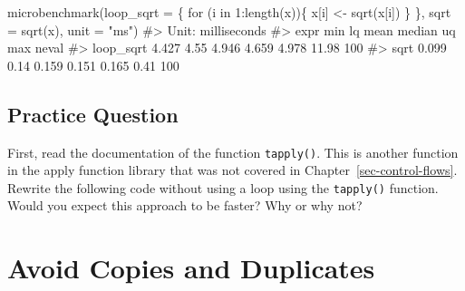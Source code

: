 \documentclass[
  letterpaper,
]{latex/krantz}
\makeatletter
\newenvironment{Shaded}{\begin{snugshade}}{\end{snugshade}}
\newcommand{\AttributeTok}[1]{\textcolor[rgb]{0.40,0.45,0.13}{#1}}
\newcommand{\CommentTok}[1]{\textcolor[rgb]{0.37,0.37,0.37}{#1}}
\newcommand{\ControlFlowTok}[1]{\textcolor[rgb]{0.00,0.23,0.31}{#1}}
\newcommand{\DecValTok}[1]{\textcolor[rgb]{0.68,0.00,0.00}{#1}}
\newcommand{\FunctionTok}[1]{\textcolor[rgb]{0.28,0.35,0.67}{#1}}
\newcommand{\NormalTok}[1]{\textcolor[rgb]{0.00,0.23,0.31}{#1}}
\newcommand{\OtherTok}[1]{\textcolor[rgb]{0.00,0.23,0.31}{#1}}
\newcommand{\SpecialCharTok}[1]{\textcolor[rgb]{0.37,0.37,0.37}{#1}}
\newcommand{\StringTok}[1]{\textcolor[rgb]{0.13,0.47,0.30}{#1}}
\newenvironment{kframe}{%
\medskip{}
\setlength{\fboxsep}{.8em}
 \def\at@end@of@kframe{}%
 \ifinner\ifhmode%
  \def\at@end@of@kframe{\end{minipage}}%
  \begin{minipage}{\columnwidth}%
 \fi\fi%
 \def\FrameCommand##1{\hskip\@totalleftmargin \hskip-\fboxsep
 \colorbox{shadecolor}{##1}\hskip-\fboxsep
     \hskip-\linewidth \hskip-\@totalleftmargin \hskip\columnwidth}%
 \MakeFramed {\advance\hsize-\width
   \@totalleftmargin\z@ \linewidth\hsize
   \@setminipage}}%
 {\par\unskip\endMakeFramed%
 \at@end@of@kframe}
\renewenvironment{Shaded}{\begin{kframe}}{\end{kframe}}
\makeatother
\begin{document}
\begin{Shaded}
\begin{Highlighting}[]
\FunctionTok{microbenchmark}\NormalTok{(}\AttributeTok{loop\_sqrt =}\NormalTok{ \{}
  \ControlFlowTok{for}\NormalTok{ (i }\ControlFlowTok{in} \DecValTok{1}\SpecialCharTok{:}\FunctionTok{length}\NormalTok{(x))\{}
\NormalTok{    x[i] }\OtherTok{\textless{}{-}} \FunctionTok{sqrt}\NormalTok{(x[i])}
\NormalTok{  \}}
\NormalTok{  \}, }\AttributeTok{sqrt =} \FunctionTok{sqrt}\NormalTok{(x), }\AttributeTok{unit =} \StringTok{"ms"}\NormalTok{)}
\CommentTok{\#\textgreater{} Unit: milliseconds}
\CommentTok{\#\textgreater{}       expr   min   lq  mean median    uq   max neval}
\CommentTok{\#\textgreater{}  loop\_sqrt 4.427 4.55 4.946  4.659 4.978 11.98   100}
\CommentTok{\#\textgreater{}       sqrt 0.099 0.14 0.159  0.151 0.165  0.41   100}
\end{Highlighting}
\end{Shaded}

\subsection{Practice Question}\label{practice-question-30}

First, read the documentation of the function
\texttt{tapply()}. This is
another function in the apply function library that was not covered in
Chapter~\ref{sec-control-flows}. Rewrite the following code without
using a loop using the \texttt{tapply()} function. Would you expect this
approach to be faster? Why or why not?

\begin{Shaded}
\end{Shaded}

\section{\texorpdfstring{Avoid Copies and Duplicates
}{Avoid Copies and Duplicates }}\label{avoid-copies-and-duplicates}
\end{document}
